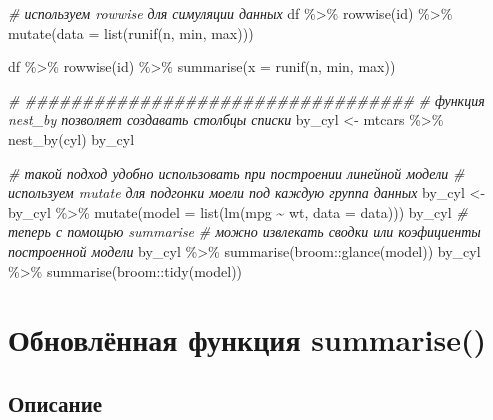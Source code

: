 \documentclass[
]{book}
\newenvironment{Shaded}{\begin{snugshade}}{\end{snugshade}}
\newcommand{\AttributeTok}[1]{\textcolor[rgb]{0.77,0.63,0.00}{#1}}
\newcommand{\CommentTok}[1]{\textcolor[rgb]{0.56,0.35,0.01}{\textit{#1}}}
\newcommand{\FunctionTok}[1]{\textcolor[rgb]{0.00,0.00,0.00}{#1}}
\newcommand{\NormalTok}[1]{#1}
\newcommand{\OtherTok}[1]{\textcolor[rgb]{0.56,0.35,0.01}{#1}}
\newcommand{\SpecialCharTok}[1]{\textcolor[rgb]{0.00,0.00,0.00}{#1}}
\begin{document}
\begin{Shaded}
\begin{Highlighting}[]
\CommentTok{\# используем rowwise для симуляции данных}
\NormalTok{df }\SpecialCharTok{\%\textgreater{}\%}
  \FunctionTok{rowwise}\NormalTok{(id) }\SpecialCharTok{\%\textgreater{}\%}
  \FunctionTok{mutate}\NormalTok{(}\AttributeTok{data =} \FunctionTok{list}\NormalTok{(}\FunctionTok{runif}\NormalTok{(n, min, max)))}

\NormalTok{df }\SpecialCharTok{\%\textgreater{}\%}
  \FunctionTok{rowwise}\NormalTok{(id) }\SpecialCharTok{\%\textgreater{}\%}
  \FunctionTok{summarise}\NormalTok{(}\AttributeTok{x =} \FunctionTok{runif}\NormalTok{(n, min, max))}

\CommentTok{\# \#\#\#\#\#\#\#\#\#\#\#\#\#\#\#\#\#\#\#\#\#\#\#\#\#\#\#\#\#\#\#\#\#\#}
\CommentTok{\# функция nest\_by позволяет создавать столбцы списки}
\NormalTok{by\_cyl }\OtherTok{\textless{}{-}}\NormalTok{ mtcars }\SpecialCharTok{\%\textgreater{}\%} \FunctionTok{nest\_by}\NormalTok{(cyl)}
\NormalTok{by\_cyl}

\CommentTok{\# такой подход удобно использовать при построении линейной модели}
\CommentTok{\# используем mutate для подгонки моели под каждую группа данных}
\NormalTok{by\_cyl }\OtherTok{\textless{}{-}}\NormalTok{ by\_cyl }\SpecialCharTok{\%\textgreater{}\%} \FunctionTok{mutate}\NormalTok{(}\AttributeTok{model =} \FunctionTok{list}\NormalTok{(}\FunctionTok{lm}\NormalTok{(mpg }\SpecialCharTok{\textasciitilde{}}\NormalTok{ wt, }\AttributeTok{data =}\NormalTok{ data)))}
\NormalTok{by\_cyl}
\CommentTok{\# теперь с помощью summarise }
\CommentTok{\# можно извлекать сводки или коэфициенты построенной модели}
\NormalTok{by\_cyl }\SpecialCharTok{\%\textgreater{}\%} \FunctionTok{summarise}\NormalTok{(broom}\SpecialCharTok{::}\FunctionTok{glance}\NormalTok{(model))}
\NormalTok{by\_cyl }\SpecialCharTok{\%\textgreater{}\%} \FunctionTok{summarise}\NormalTok{(broom}\SpecialCharTok{::}\FunctionTok{tidy}\NormalTok{(model))}
\end{Highlighting}
\end{Shaded}

\hypertarget{ux43eux431ux43dux43eux432ux43bux451ux43dux43dux430ux44f-ux444ux443ux43dux43aux446ux438ux44f-summarise}{%
\chapter{Обновлённая функция summarise()}\label{ux43eux431ux43dux43eux432ux43bux451ux43dux43dux430ux44f-ux444ux443ux43dux43aux446ux438ux44f-summarise}}

\hypertarget{ux43eux43fux438ux441ux430ux43dux438ux435-3}{%
\section{Описание}\label{ux43eux43fux438ux441ux430ux43dux438ux435-3}}
\end{document}
